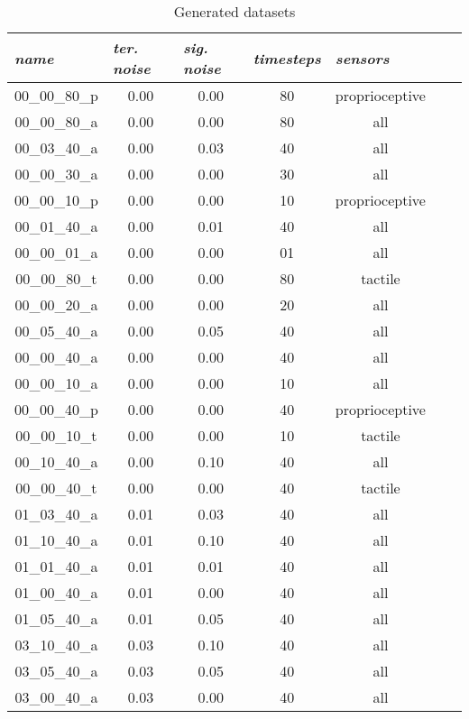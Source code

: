 \begin{table}[H]
\centering
\caption{Generated datasets}
\label{app:tab:generated_datasets}
\begin{tabular}{|c|c|c|c|c|c|c|}
\hline
\multicolumn{1}{|l|}{\textit{name}} & \multicolumn{1}{l|}{\textit{ter. noise}} & \multicolumn{1}{l|}{\textit{sig. noise}} & \multicolumn{1}{l|}{\textit{timesteps}} & \multicolumn{1}{l|}{\textit{sensors}} \\ \hline
00\_00\_80\_p	& 0.00	& 0.00	& 80	& proprioceptive	 \\ \hline
00\_00\_80\_a	& 0.00	& 0.00	& 80	& all	 \\ \hline
00\_03\_40\_a	& 0.00	& 0.03	& 40	& all	 \\ \hline
00\_00\_30\_a	& 0.00	& 0.00	& 30	& all	 \\ \hline
00\_00\_10\_p	& 0.00	& 0.00	& 10	& proprioceptive	 \\ \hline
00\_01\_40\_a	& 0.00	& 0.01	& 40	& all	 \\ \hline
00\_00\_01\_a	& 0.00	& 0.00	& 01	& all	 \\ \hline
00\_00\_80\_t	& 0.00	& 0.00	& 80	& tactile	 \\ \hline
00\_00\_20\_a	& 0.00	& 0.00	& 20	& all	 \\ \hline
00\_05\_40\_a	& 0.00	& 0.05	& 40	& all	 \\ \hline
00\_00\_40\_a	& 0.00	& 0.00	& 40	& all	 \\ \hline
00\_00\_10\_a	& 0.00	& 0.00	& 10	& all	 \\ \hline
00\_00\_40\_p	& 0.00	& 0.00	& 40	& proprioceptive	 \\ \hline
00\_00\_10\_t	& 0.00	& 0.00	& 10	& tactile	 \\ \hline
00\_10\_40\_a	& 0.00	& 0.10	& 40	& all	 \\ \hline
00\_00\_40\_t	& 0.00	& 0.00	& 40	& tactile	 \\ \hline
01\_03\_40\_a	& 0.01	& 0.03	& 40	& all	 \\ \hline
01\_10\_40\_a	& 0.01	& 0.10	& 40	& all	 \\ \hline
01\_01\_40\_a	& 0.01	& 0.01	& 40	& all	 \\ \hline
01\_00\_40\_a	& 0.01	& 0.00	& 40	& all	 \\ \hline
01\_05\_40\_a	& 0.01	& 0.05	& 40	& all	 \\ \hline
03\_10\_40\_a	& 0.03	& 0.10	& 40	& all	 \\ \hline
03\_05\_40\_a	& 0.03	& 0.05	& 40	& all	 \\ \hline
03\_00\_40\_a	& 0.03	& 0.00	& 40	& all	 \\ \hline

\end{tabular}
\end{table}
